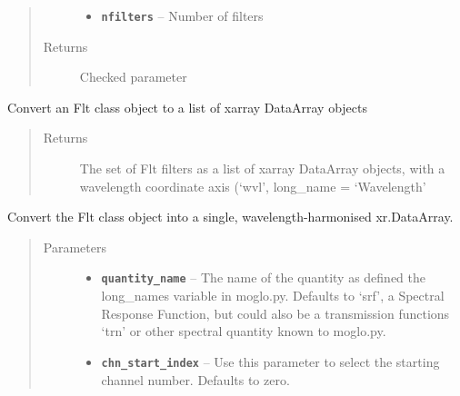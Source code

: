 \documentclass[a4paper,10pt,english]{sphinxmanual}
\begin{document}
\begin{fulllineitems}
\begin{fulllineitems}
\begin{quote}
\begin{description}
\begin{itemize}
\item {} 
\textbf{\texttt{nfilters}} -- Number of filters

\end{itemize}

\item[{Returns}] \leavevmode
Checked parameter

\end{description}\end{quote}

\end{fulllineitems}


\begin{fulllineitems}
\label{packages:radute.Flt.flt_as_xd}
Convert an Flt class object to a list of xarray DataArray objects
\begin{quote}\begin{description}
\item[{Returns}] \leavevmode
The set of Flt filters as a list of xarray DataArray objects, with a wavelength coordinate
axis (`wvl', long\_name = `Wavelength'

\end{description}\end{quote}

\end{fulllineitems}


\begin{fulllineitems}
\label{packages:radute.Flt.flt_as_xd_harmonised}
Convert the Flt class object into a single, wavelength-harmonised xr.DataArray.
\begin{quote}\begin{description}
\item[{Parameters}] \leavevmode\begin{itemize}
\item {} 
\textbf{\texttt{quantity\_name}} -- The name of the quantity as defined the long\_names variable in moglo.py. Defaults to
`srf', a Spectral Response Function, but could also be a transmission functions `trn' or other spectral
quantity known to moglo.py.

\item {} 
\textbf{\texttt{chn\_start\_index}} -- Use this parameter to select the starting channel number. Defaults to zero.


\end{itemize}
\end{description}
\end{quote}
\end{fulllineitems}
\end{fulllineitems}
\end{document}
